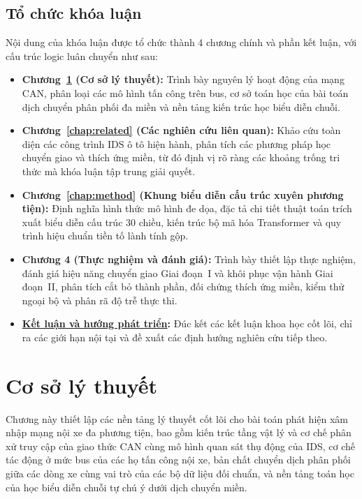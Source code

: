 \documentclass[12pt, a4paper, reqno, oneside]{book}
\newcommand\sect[1]{%
  \Needspace{5\baselineskip}%
  \phantomsection%
  \addcontentsline{toc}{section}{#1}%
  \section*{#1}%
}
\begin{document}
\sect{Tổ chức khóa luận}
Nội dung của khóa luận được tổ chức thành 4 chương chính và phần kết luận, với cấu trúc logic luân chuyển như sau:
\begin{itemize}
    \item \textbf{Chương~\ref{chap:background} (Cơ sở lý thuyết):} Trình bày nguyên lý hoạt động của mạng CAN, phân loại các mô hình tấn công trên bus, cơ sở toán học của bài toán dịch chuyển phân phối đa miền và nền tảng kiến trúc học biểu diễn chuỗi.
    \item \textbf{Chương~\ref{chap:related} (Các nghiên cứu liên quan):} Khảo cứu toàn diện các công trình IDS ô tô hiện hành, phân tích các phương pháp học chuyển giao và thích ứng miền, từ đó định vị rõ ràng các khoảng trống tri thức mà khóa luận tập trung giải quyết.
    \item \textbf{Chương~\ref{chap:method} (Khung biểu diễn cấu trúc xuyên phương tiện):} Định nghĩa hình thức mô hình đe dọa, đặc tả chi tiết thuật toán trích xuất biểu diễn cấu trúc 30 chiều, kiến trúc bộ mã hóa Transformer và quy trình hiệu chuẩn tiền tố lành tính gộp.
    \item \textbf{Chương 4 (Thực nghiệm và đánh giá):} Trình bày thiết lập thực nghiệm, đánh giá hiệu năng chuyển giao Giai đoạn~I và khôi phục vận hành Giai đoạn~II, phân tích cắt bỏ thành phần, đối chứng thích ứng miền, kiểm thử ngoại bộ và phân rã độ trễ thực thi.
    \item \textbf{\hyperref[chap:conclusion]{Kết luận và hướng phát triển}:} Đúc kết các kết luận khoa học cốt lõi, chỉ ra các giới hạn nội tại và đề xuất các định hướng nghiên cứu tiếp theo.
\end{itemize}

\chapter{Cơ sở lý thuyết}\label{chap:background}
Chương này thiết lập các nền tảng lý thuyết cốt lõi cho bài toán phát hiện xâm nhập mạng nội xe đa phương tiện, bao gồm kiến trúc tầng vật lý và cơ chế phân xử truy cập của giao thức CAN cùng mô hình quan sát thụ động của IDS, cơ chế tác động ở mức bus của các họ tấn công nội xe, bản chất chuyển dịch phân phối giữa các dòng xe cùng vai trò của các bộ dữ liệu đối chuẩn, và nền tảng toán học của học biểu diễn chuỗi tự chú ý dưới dịch chuyển miền.
\end{document}
